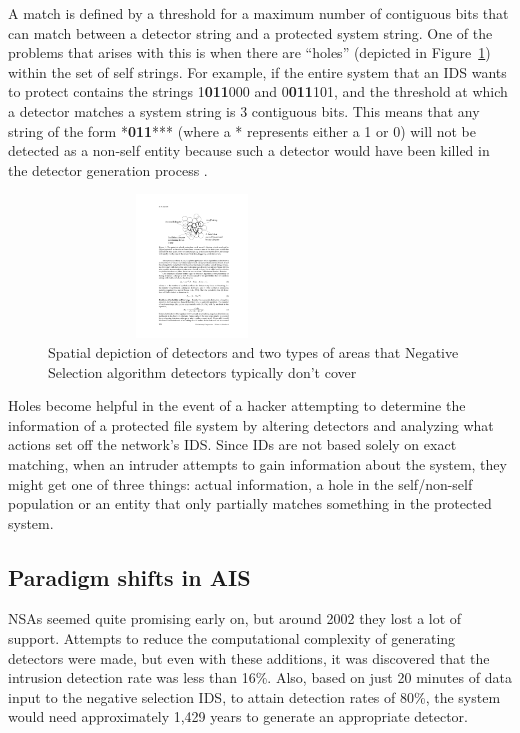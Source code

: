 \documentclass{umm-senior-sem}
\begin{document}
A match is defined by a threshold for a maximum number of contiguous bits that can match between a detector string and a protected system string. One of the problems that arises with this is when there are ``holes'' (depicted in Figure~\ref{fig:hole}) within the set of self strings. For example, if the entire system that an IDS wants to protect contains the strings 1\textbf{011}000 and 0\textbf{011}101, and the threshold at which a detector matches a system string is 3 contiguous bits. This means that any string of the form *\textbf{011}*** (where a * represents either a 1 or 0) will not be detected as a non-self entity because such a detector would have been killed in the detector generation process
\cite{evalAIS:2005}.
\begin{figure}
\includegraphics[width=3in, height=1.5in]{images/holes.pdf}
\caption{Spatial depiction of detectors and two types of areas that Negative Selection algorithm detectors typically don't cover~\cite{evalAIS:2005}}
\label{fig:hole}
\end{figure}
Holes become helpful in the event of a hacker attempting to determine the information of a protected file system by altering detectors and analyzing what actions set off the network's IDS. Since IDs are not based solely on exact matching, when an intruder attempts to gain information about the system, they might get one of three things: actual information, a hole in the self/non-self population or an entity that only partially matches something in the protected system.

\pagebreak
\subsection{Paradigm shifts in AIS}
NSAs seemed quite promising early on, but around 2002 they lost a lot of support. Attempts to reduce the computational complexity of generating detectors were made, but even with these additions, it was discovered that the intrusion detection rate was less than 16\%. Also, based on just 20 minutes of data input to the negative selection IDS, to attain detection rates of 80\%, the system would need approximately 1,429 years to generate an appropriate detector. 
\end{document}
